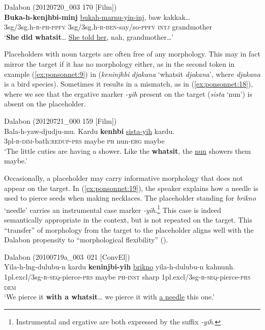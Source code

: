 \documentclass[output=paper]{langscibook}
\begin{document}
\ea
{\label{ex:ponsonnet:17}Dalabon (20120720\_003 170 [Film])}\\
\gll \textbf{Buka-h-kenjhbi-minj} \uline{bukah-marnu-yin-inj},     baw kakkak…\\
\textup{3sg/3sg.h}\textsc{-r-ph-ppfv} 3sg/3sg.h\textsc{{}-r}{}-\textsc{ben}{}-say/so-\textsc{ppfv}  \textsc{intj}  grandmother\\

\glt ‘\textbf{She} \textbf{did} \textbf{whatsit}… \uline{She told her}, nah, grandmother…’
\z 

Placeholders with noun targets are often free of any morphology. This may in fact mirror the target if it has no morphology either, as in the second token in example (\ref{ex:ponsonnet:9}) in  (\textit{keninjhbi} \textit{djakana} ‘whatsit \textit{djakana}’, where \textit{djakana} is a bird species). Sometimes it results in a mismatch, as in (\ref{ex:ponsonnet:18}), where we see that the ergative marker \textit{{}-yih} present on the target (\textit{sista} ‘nun’) is absent on the placeholder. 

\ea
{\label{ex:ponsonnet:18}Dalabon (20120721\_000 159 [Film])}\\
\gll Bala-h-yaw-djudju-mu. Kardu   \textbf{kenhbi}   \uline{sista-yih}   kardu.   \\
\textup{3pl-}\textsc{r-dim}\textup{{}-bath:}\textsc{redup-prs} \textup{maybe} \textsc{ph} \textup{nun-}\textsc{erg} \textup{maybe}\\
\glt \textup{‘The little cuties are having a shower. Like the} \textbf{\textup{whatsit}}\textup{, the \uline{nun} showers them maybe.’}\\
\z

Occasionally, a placeholder may carry informative morphology that does not appear on the target. In (\ref{ex:ponsonnet:19}), the speaker explains how a needle is used to pierce seeds when making necklaces. The placeholder standing for \textit{brikno} ‘needle’ carries an instrumental case marker \textit{-yih}.\footnote{Instrumental and ergative are both expressed by the suffix \textit{{}-yih}.} This case is indeed semantically appropriate in the context, but is not repeated on the target. This “transfer” of morphology from the target to the placeholder aligns well with the Dalabon propensity to “morphological flexibility” ().


\ea
{\label{ex:ponsonnet:19}Dalabon (20100719a\_003~021 [ConvEl])}\\
\gll Yila-h-lng-dulubu-n           kardu   \textbf{keninjbi-yih} \uline{brikno}   yila-h-dulubu-n       kahnunh.\\
\textup{1pl.excl/3sg-}\textsc{r-seq}\textup{{}-pierce-}\textsc{prs} \textup{maybe} \textsc{ph}\textup{{}-}\textsc{inst} \textup{sharp}  1pl.excl/3sg-\textsc{r-seq}\textup{{}-pierce-}\textsc{prs} \textsc{dem}\\
\glt \textup{‘We pierce it} \textbf{\textup{with} \textbf{a} \textbf{whatsit}}\textup{… we pierce it with \uline{a needle} this one.’}\\
\z
\end{document}

